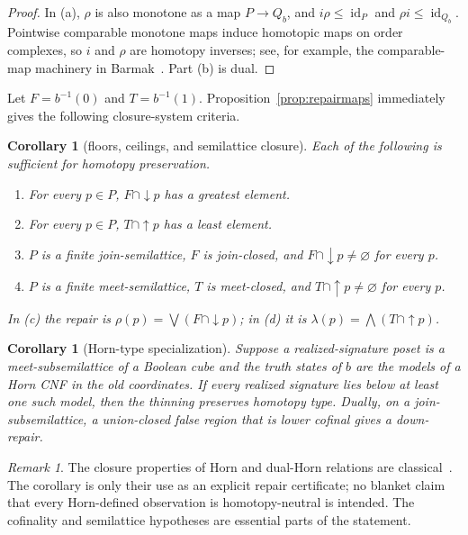 \documentclass[11pt]{article}
\newtheorem{corollary}[theorem]{Corollary}
\theoremstyle{definition}
\theoremstyle{remark}
\newtheorem{remark}[theorem]{Remark}
\begin{document}
\begin{proof}
In (a), $\rho$ is also monotone as a map $P\to Q_b$, and
$i\rho\le\operatorname{id}_P$ and $\rho i\le\operatorname{id}_{Q_b}$.  Pointwise
comparable monotone maps induce homotopic maps on order complexes, so $i$ and $\rho$
are homotopy inverses; see, for example, the comparable-map machinery in
Barmak~\cite{Barmak2011A}.  Part (b) is dual.
\end{proof}

Let $F=b^{-1}(0)$ and $T=b^{-1}(1)$.  Proposition~\ref{prop:repairmaps} immediately
gives the following closure-system criteria.

\begin{corollary}[floors, ceilings, and semilattice closure]\label{cor:closure}
Each of the following is sufficient for homotopy preservation.
\begin{enumerate}[label=(\alph*)]
\item For every $p\in P$, $F\cap\downarrow p$ has a greatest element.
\item For every $p\in P$, $T\cap\uparrow p$ has a least element.
\item $P$ is a finite join-semilattice, $F$ is join-closed, and
$F\cap\downarrow p\ne\varnothing$ for every $p$.
\item $P$ is a finite meet-semilattice, $T$ is meet-closed, and
$T\cap\uparrow p\ne\varnothing$ for every $p$.
\end{enumerate}
In (c) the repair is $\rho(p)=\bigvee(F\cap\downarrow p)$; in (d) it is
$\lambda(p)=\bigwedge(T\cap\uparrow p)$.
\end{corollary}

\begin{corollary}[Horn-type specialization]\label{cor:horn}
Suppose a realized-signature poset is a meet-subsemilattice of a Boolean cube and the
truth states of $b$ are the models of a Horn CNF in the old coordinates.  If every
realized signature lies below at least one such model, then the thinning preserves
homotopy type.  Dually, on a join-subsemilattice, a union-closed false region that is
lower cofinal gives a down-repair.
\end{corollary}

\begin{remark}
The closure properties of Horn and dual-Horn relations are classical~\cite{JeavonsCohenGyssens1997,Wild2017}.
The corollary is only their use as an explicit repair certificate; no blanket claim
that every Horn-defined observation is homotopy-neutral is intended.  The cofinality
and semilattice hypotheses are essential parts of the statement.
\end{remark}
\end{document}
